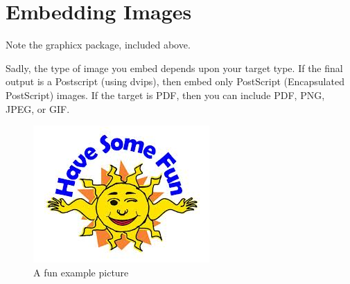 \documentclass[a4paper,12pt,titlepage]{article}
\begin{document}
\section{Embedding Images}

Note the graphicx package, included above.

Sadly, the type of image you embed depends upon your target type.  If the
final output is a Postscript (using dvips), then embed only PostScript
(Encapsulated PostScript) images.  If the target is PDF, then you can
include PDF, PNG, JPEG, or GIF.

\begin{figure}[htp]
	\centering
		\includegraphics[angle=30,scale=0.6]{sunFun.jpeg}
		\caption{A fun example picture}
		\label{fig:sun 1}
\end{figure}

\end{document}

